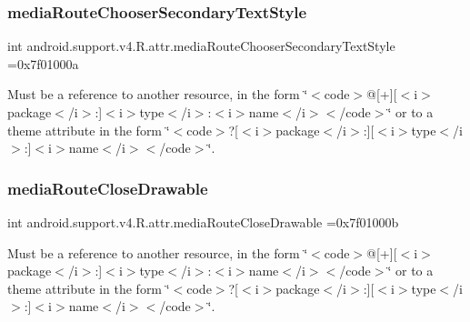 \subsubsection{\texorpdfstring{media\+Route\+Chooser\+Secondary\+Text\+Style}{mediaRouteChooserSecondaryTextStyle}}
{\footnotesize\ttfamily int android.\+support.\+v4.\+R.\+attr.\+media\+Route\+Chooser\+Secondary\+Text\+Style =0x7f01000a\hspace{0.3cm}{\ttfamily [static]}}

Must be a reference to another resource, in the form \char`\"{}$<$code$>$@\mbox{[}+\mbox{]}\mbox{[}$<$i$>$package$<$/i$>$\+:\mbox{]}$<$i$>$type$<$/i$>$\+:$<$i$>$name$<$/i$>$$<$/code$>$\char`\"{} or to a theme attribute in the form \char`\"{}$<$code$>$?\mbox{[}$<$i$>$package$<$/i$>$\+:\mbox{]}\mbox{[}$<$i$>$type$<$/i$>$\+:\mbox{]}$<$i$>$name$<$/i$>$$<$/code$>$\char`\"{}. \mbox{\label{classandroid_1_1support_1_1v4_1_1R_1_1attr_a6019a93ba270689583c86bd27b047e92}} 
\subsubsection{\texorpdfstring{media\+Route\+Close\+Drawable}{mediaRouteCloseDrawable}}
{\footnotesize\ttfamily int android.\+support.\+v4.\+R.\+attr.\+media\+Route\+Close\+Drawable =0x7f01000b\hspace{0.3cm}{\ttfamily [static]}}

Must be a reference to another resource, in the form \char`\"{}$<$code$>$@\mbox{[}+\mbox{]}\mbox{[}$<$i$>$package$<$/i$>$\+:\mbox{]}$<$i$>$type$<$/i$>$\+:$<$i$>$name$<$/i$>$$<$/code$>$\char`\"{} or to a theme attribute in the form \char`\"{}$<$code$>$?\mbox{[}$<$i$>$package$<$/i$>$\+:\mbox{]}\mbox{[}$<$i$>$type$<$/i$>$\+:\mbox{]}$<$i$>$name$<$/i$>$$<$/code$>$\char`\"{}. \mbox{\label{classandroid_1_1support_1_1v4_1_1R_1_1attr_a5b3d3bf38fc13be643d70cd6a68ca3c3}} 
